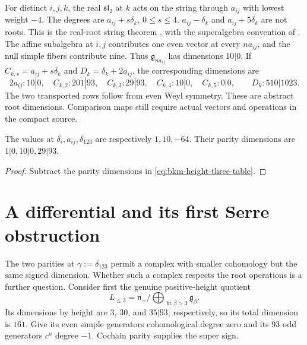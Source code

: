 \begin{remark}
\label{rem:bkm-affine-string}
For distinct $i,j,k$, the real $\mathfrak{sl}_2$ at $k$ acts on
the string through $a_{ij}$ with lowest weight $-4$.
The degrees are $a_{ij}+s\delta_k$, $0\leq s\leq4$.
$a_{ij}-\delta_k$ and $a_{ij}+5\delta_k$ are not roots.
This is the real-root string theorem
\cite[Proposition~5.1(c)]{KAC:1}, with the superalgebra convention
of \cite[Section~6]{GN}. The affine subalgebra at $i,j$ contributes
one even vector at every $na_{ij}$, and the null simple fibers
contribute nine. Thus $\mathfrak g_{na_{ij}}$ has dimensions $10|0$.
\label{rem:bkm-relation-window-target-parity}
If $C_{k,s}=a_{ij}+s\delta_k$ and $D_k=\delta_k+2a_{ij}$, the
corresponding dimensions are
\[
 2a_{ij}:10|0,\quad C_{k,2}:201|93,\quad
 C_{k,3}:29|93,\quad C_{k,4}:10|0,\quad C_{k,5}:0|0,
 \qquad D_k:510|1023.
\]
The two transported rows follow from even Weyl symmetry. These
are abstract root dimensions. Comparison maps still require actual
vectors and operations in the compact source.
\end{remark}

\begin{corollary}
\label{cor:bkm-real-isotropic-multiplicities}
The values at $\delta_i,a_{ij},\delta_{123}$ are respectively
$1,10,-64$. Their parity dimensions are $1|0,10|0,29|93$.
\end{corollary}
\begin{proof}
Subtract the parity dimensions in
\eqref{eq:bkm-height-three-table}.
\end{proof}

\section{A differential and its first Serre obstruction}
\label{sec:bkm-root-differential}

The two parities at $\gamma:=\delta_{123}$ permit a complex with
smaller cohomology but the same signed dimension. Whether such a
complex respects the root operations is a further question.
Consider first the genuine positive-height quotient
\[
 L_{\leq3}=\mathfrak n_+/
       \bigoplus_{\operatorname{ht}\beta>3}\mathfrak g_\beta.
\]
Its dimensions by height are $3$, $30$, and $35|93$, respectively,
so its total dimension is $161$. Give its even simple generators
cohomological degree zero and its $93$ odd generators $c^u$ degree
$-1$. Cochain parity supplies the super sign.

